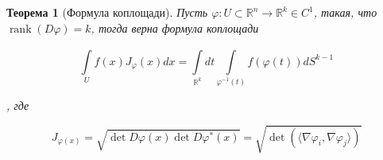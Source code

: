 \documentclass[a5paper]{article}
\newcounter{through}
\theoremstyle{plain}
\newtheorem{theorem}[through]{Теорема}
\theoremstyle{definition}
\numberwithin{through}{section}
\numberwithin{equation}{section}
\DeclareMathOperator{\rank}{rank}
\begin{document}
\begin{theorem}[Формула коплощади]
	Пусть $\varphi : U \subset \mathbb{R}^n \to \mathbb{R}^k \in C^1$, такая, что $\rank (D \varphi) = k$, тогда верна формула коплощади
	
	\begin{equation*}
		\int\limits_{U}^{} f(x) J_{\varphi}(x) dx = \int\limits_{\mathbb{R}^k}^{}dt \int\limits_{\varphi^{-1}(t)} f(\varphi(t)) dS^{k-1}
	\end{equation*} 
	
	, где 
	
	\begin{equation*}
		J_{\varphi(x)} = \sqrt{\det D \varphi (x) \det D \varphi^* (x)} = \sqrt{\det (\langle \nabla \varphi_i, \nabla \varphi_j \rangle)}
	\end{equation*}
\end{theorem}
\end{document}
